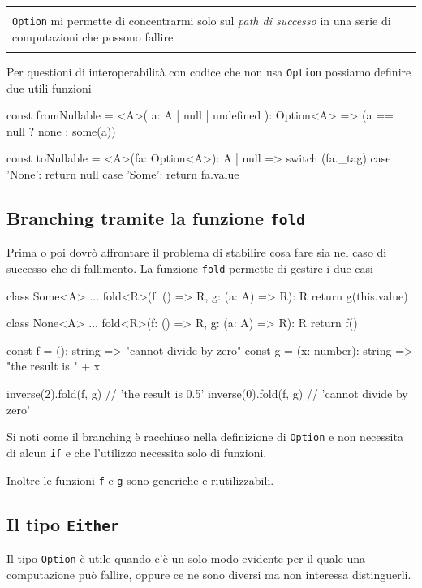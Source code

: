 \documentclass[12pt]{article}
\theoremstyle{definition}
\newenvironment{demo}
    {\begin{center}
    \begin{tabular}{|p{0.9\textwidth}|}
    \hline\\
    }
    {
    \\\\\hline
    \end{tabular}
    \end{center}
    }
\newenvironment{code}
  {\vspace{0.5cm} \VerbatimEnvironment\begin{typescriptcode}}
  {\end{typescriptcode} \vspace{0.2cm}}
\begin{document}
\begin{demo}
\texttt{Option} mi permette di concentrarmi solo sul \emph{path di successo} in una serie di computazioni che possono fallire
\end{demo}

Per questioni di interoperabilità con codice che non usa \texttt{Option} possiamo definire due utili funzioni

\begin{code}
const fromNullable = <A>(
  a: A | null | undefined
): Option<A> => (a == null ? none : some(a))

const toNullable = <A>(fa: Option<A>): A | null => {
  switch (fa._tag) {
    case 'None':
      return null
    case 'Some':
      return fa.value
  }
}
\end{code}

\subsection{Branching tramite la funzione \texttt{fold}}

Prima o poi dovrò affrontare il problema di stabilire cosa fare sia nel caso di successo che di fallimento.
La funzione \texttt{fold} permette di gestire i due casi

\begin{code}
class Some<A> {
  ...
  fold<R>(f: () => R, g: (a: A) => R): R {
    return g(this.value)
  }
}

class None<A> {
  ...
  fold<R>(f: () => R, g: (a: A) => R): R {
    return f()
  }
}

const f = (): string => "cannot divide by zero"
const g = (x: number): string => "the result is " + x

inverse(2).fold(f, g) // 'the result is 0.5'
inverse(0).fold(f, g) // 'cannot divide by zero'
\end{code}

Si noti come il branching è racchiuso nella definizione di \texttt{Option} e non necessita di alcun \texttt{if}
e che l'utilizzo necessita solo di funzioni.

Inoltre le funzioni \texttt{f} e \texttt{g} sono generiche e riutilizzabili.

\subsection{Il tipo \texttt{Either}}

Il tipo \texttt{Option} è utile quando c'è un solo modo evidente per il quale una computazione può fallire,
oppure ce ne sono diversi ma non interessa distinguerli.
\end{document}
